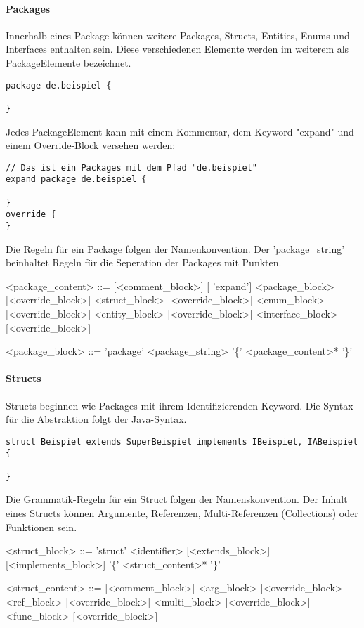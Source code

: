 \documentclass[./einleitung.tex]{subfiles}
\begin{document}
\paragraph{Packages}
Innerhalb eines Package können weitere Packages, Structs, Entities, Enums und Interfaces enthalten sein. Diese verschiedenen Elemente werden im weiterem als PackageElemente bezeichnet.\\
\begin{lstlisting}
package de.beispiel {

}
\end{lstlisting}
Jedes PackageElement kann mit einem Kommentar, dem Keyword "expand" und einem Override-Block versehen werden:
\begin{lstlisting}
// Das ist ein Packages mit dem Pfad "de.beispiel"
expand package de.beispiel {

}
override {
}
\end{lstlisting}

Die Regeln für ein Package folgen der Namenkonvention. Der 'package_string' beinhaltet Regeln für die Seperation der Packages mit Punkten.
\begin{grammar}
<package_content> ::= [<comment_block>] [ 'expand'] <package_block> [<override_block>]
 <struct_block> [<override_block>]
 <enum_block> [<override_block>]
 <entity_block> [<override_block>]
 <interface_block> [<override_block>]

<package_block> ::= 'package' <package_string> '\{' <package_content>* '\}'
\end{grammar}

\paragraph{Structs} 
Structs beginnen wie Packages mit ihrem Identifizierenden Keyword. Die Syntax für die Abstraktion folgt der Java-Syntax.
\begin{lstlisting}
struct Beispiel extends SuperBeispiel implements IBeispiel, IABeispiel {

}
\end{lstlisting}

Die Grammatik-Regeln für ein Struct folgen der Namenskonvention. Der Inhalt eines Structs können Argumente, Referenzen, Multi-Referenzen (Collections) oder Funktionen sein.
\begin{grammar}
<struct_block> ::= 'struct' <identifier> [<extends_block>] [<implements_block>] '\{' <struct_content>* '\}'

<struct_content> ::= [<comment_block>] <arg_block> [<override_block>]
 <ref_block> [<override_block>]
 <multi_block> [<override_block>]
 <func_block> [<override_block>]

\end{grammar}
\end{document}
